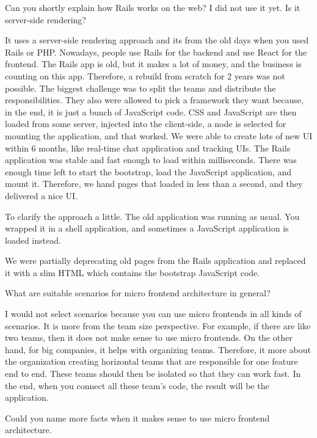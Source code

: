 \begin{description}
    \NicoVogel Can you shortly explain how Rails works on the web? I did not use it yet. Is it server-side rendering?

    \IvanJovanovic It uses a server-side rendering approach and its from the old days when you used Rails or PHP. Nowadays, people use Rails for the backend and use React for the frontend. The Rails app is old, but it makes a lot of money, and the business is counting on this app. Therefore, a rebuild from scratch for 2 years was not possible.
    The biggest challenge was to split the teams and distribute the responsibilities. They also were allowed to pick a framework they want because, in the end, it is just a bunch of JavaScript code. CSS and JavaScript are then loaded from some server, injected into the client-side, a node is selected for mounting the application, and that worked. We were able to create lots of new UI within 6 months, like real-time chat application and tracking UIs. The Rails application was stable and fast enough to load within milliseconds. There was enough time left to start the bootstrap, load the JavaScript application, and mount it. Therefore, we hand pages that loaded in less than a second, and they delivered a nice UI.

    \NicoVogel To clarify the approach a little. The old application was running as usual. You wrapped it in a shell application, and sometimes a JavaScript application is loaded instead.

    \IvanJovanovic We were partially deprecating old pages from the Rails application and replaced it with a slim HTML which contains the bootstrap JavaScript code.

    \NicoVogel What are suitable scenarios for micro frontend architecture in general?

    \IvanJovanovic I would not select scenarios because you can use micro frontends in all kinds of scenarios. It is more from the team size perspective. For example, if there are like two teams, then it does not make sense to use micro frontends. On the other hand, for big companies, it helps with organizing teams. Therefore, it more about the organization creating horizontal teams that are responsible for one feature end to end. These teams should then be isolated so that they can work fast. In the end, when you connect all these team's code, the result will be the application.

    \NicoVogel Could you name more facts when it makes sense to use micro frontend architecture.


\end{description}

